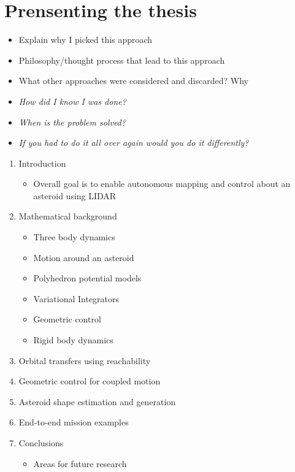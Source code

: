 
\section{Prensenting the thesis}
\begin{itemize}
    \item Explain why I picked this approach
    \item Philosophy/thought process that lead to this approach
    \item What other approaches were considered and discarded? Why
    \item \emph{How did I know I was done?}
    \item \emph{When is the problem solved?}
    \item \emph{If you had to do it all over again would you do it differently?}
\end{itemize}

\begin{enumerate}
    \item Introduction
        \begin{itemize}
            \item Overall goal is to enable autonomous mapping and control about an asteroid using LIDAR
        \end{itemize}
    \item Mathematical background
        \begin{itemize}
            \item Three body dynamics
            \item Motion around an asteroid
            \item Polyhedron potential models
            \item Variational Integrators
            \item Geometric control
            \item Rigid body dynamics
        \end{itemize}
    \item Orbital transfers using reachability
    \item Geometric control for coupled motion
    \item Asteroid shape estimation and generation
    \item End-to-end mission examples
    \item Conclusions
        \begin{itemize}
            \item Areas for future research
        \end{itemize}
\end{enumerate}


